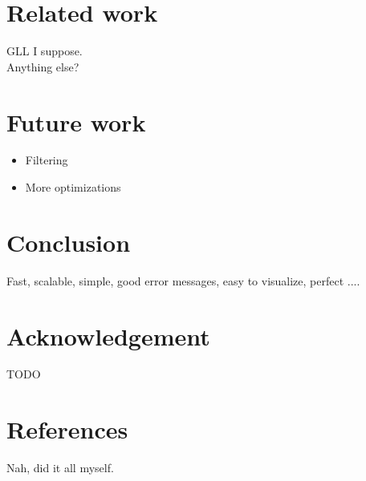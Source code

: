 \documentclass[a4paper,10pt]{article}
\begin{document}
\section{Related work}

GLL I suppose.\\
Anything else?

\section{Future work}

\begin{itemize}
 \setlength{\itemsep}{0pt}
 \setlength{\parskip}{0pt}
 \setlength{\parsep}{0pt}
 
 \item Filtering
 \item More optimizations
\end{itemize}

\section{Conclusion}

Fast, scalable, simple, good error messages, easy to visualize, perfect ....

\section{Acknowledgement}

TODO

\section{References}

Nah, did it all myself.
\end{document}
